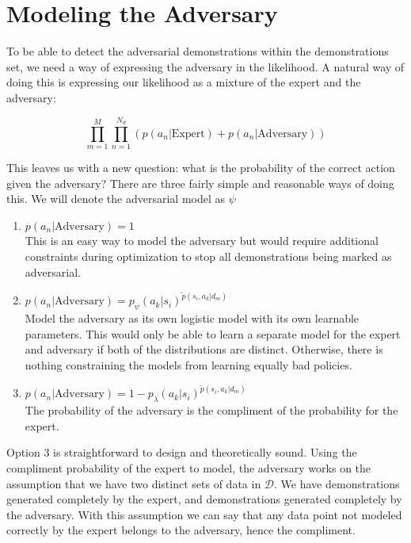 \documentclass[11pt]{article}
\newcommand{\data}{\mathcal{D}}
\begin{document}
\section{Modeling the Adversary}

To be able to detect the adversarial demonstrations within the demonstrations set, we need a way of expressing the adversary in the likelihood. A natural way of doing this is expressing our likelihood as a mixture of the expert and the adversary:

\begin{equation} \label{basic_mixture}
    \prod_{m=1}^{M} \prod_{n=1}^{N_{d}}\left( p(a_{n}|\text{Expert}) + p(a_{n}|\text{Adversary}) \right)
\end{equation} 

This leaves us with a new question: what is the probability of the correct action given the adversary? There are three fairly simple and reasonable ways of doing this. We will denote the adversarial model as $\psi$

\begin{enumerate}
       \item $p(a_{n}|\text{Adversary}) = 1$\\ This is an easy way to model the adversary but would require additional constraints during optimization to stop all demonstrations being marked as adversarial.
       \item $p(a_{n}|\text{Adversary}) = p_{\psi}(a_{k}|s_{i})^{\widetilde{p}(s_{i}, a_{k}| d_{m})}$\\ Model the adversary as its own logistic model with its own learnable parameters. This would only be able to learn a separate model for the expert and adversary if both of the distributions are distinct. Otherwise, there is nothing constraining the models from learning equally bad policies.
       \item $p(a_{n}|\text{Adversary}) = 1 - p_{\lambda}(a_{k}|s_{i})^{\widetilde{p}(s_{i}, a_{k}| d_{m})}$\\
       The probability of the adversary is the compliment of the probability for the expert.
 \end{enumerate} 

Option 3 is straightforward to design and theoretically sound. Using the compliment probability of the expert to model, the adversary works on the assumption that we have two distinct sets of data in  $\data$. We have demonstrations generated completely by the expert, and demonstrations generated completely by the adversary. With this assumption we can say that any data point not modeled correctly by the expert belongs to the adversary, hence the compliment.
\end{document}
